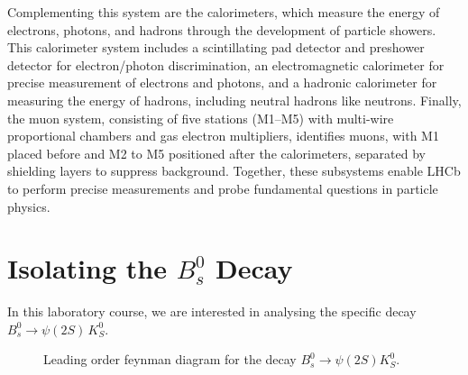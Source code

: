     Complementing this system are the calorimeters, which measure the energy of electrons, photons, and hadrons through the development of particle showers. This calorimeter system includes a scintillating pad detector and preshower detector for electron/photon discrimination, an electromagnetic calorimeter for precise measurement of electrons and photons, and a hadronic calorimeter for measuring the energy of hadrons, including neutral hadrons like neutrons. Finally, the muon system, consisting of five stations (M1–M5) with multi-wire proportional chambers and gas electron multipliers, identifies muons, with M1 placed before and M2 to M5 positioned after the calorimeters, separated by shielding layers to suppress background. Together, these subsystems enable LHCb to perform precise measurements and probe fundamental questions in particle physics.
\newpage
\section{\texorpdfstring{Isolating the $B_{s}^{0}$}{} Decay}

In this laboratory course, we are interested in analysing the specific decay $B_s^0 \rightarrow \psi(2S)\,K_S^0$.
\begin{figure}[H]
    \centering
\caption{Leading order feynman diagram for the decay $B^{0}_{s} \xrightarrow{} \psi(2S)K^{0}_{S}$.}
\end{figure}

